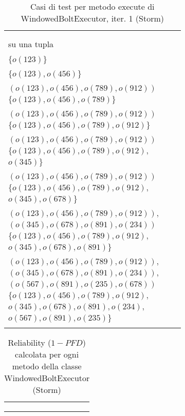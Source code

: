 \documentclass[10pt, a4paper]{article}
\newcommand{\Intmaketable}[4]{
	\begin{longtable}{#3}
	#4
	\caption{#2}
	\label{#1}
	\end{longtable}
}
\newcommand{\Inttestctable}[3]{
	\Intmaketable{#1}{#2}{|l|l|l|}{
	\hline
	\thead{Input} & \thead{Esito atteso} & \thead{Motivazione}\\
	\hline
	\hline
	#3
	\hline}
}
\newcommand{\Intreltable}[3]{
	\Intmaketable{#1}{#2}{|l|l|l|l|l|l|l|}{
	\hline
	\thead{Metodo} & \thead{\# test totali} & \thead{\# test pass.} & \thead{\# test fail.} & \thead{Prof. op.} &
	\thead{Distribuzione} & \thead{Reliability}\\
	\hline
	\hline
	#3
	\hline}
}
\newcommand{\Inttestccaption}[4]{Casi di test per metodo #1 di #2, iter. #3 (#4)}
\newcommand{\Intrelcaption}[2]{Reliability ($1-PFD$) calcolata per ogni metodo della classe #1 (#2)}
\newcommand{\gettablelabel}[5]{table:#1:#2:#3:iter#4:proj#5}
\newcommand{\getreltablelabel}[2]{\gettablelabel{#1}{}{}{}{#2}}
\newcommand{\testctable}[5]{
	\Inttestctable{\gettablelabel{testc}{#1}{#2}{#3}{#4}}
		{\Inttestccaption{#1}{#2}{#3}{#4}}
		{#5}
}
\newcommand{\reltable}[3] {
	\Intreltable{\getreltablelabel{#1}{#2}}
		{\Intrelcaption{#1}{#2}}
		{#3}
}
\newcommand{\unifdist}[1]{Uniforme: $#1$}
\newcommand{\tcell}{\makecell[tl]}
\newcommand{\newtrow}{\\ \hline}
\def\storm{Storm}
\begin{document}
	\testctable{execute}{WindowedBoltExecutor}{1}{\storm}{
			\tcell{null} &
			\tcell{RuntimeException viene lanciata} &
			\tcell{} 
		\newtrow
			\tcell{makeTuple(123)} &
			\tcell{Nessuna tupla di finestre} &
			\tcell{Nessun pre-esecuzione del bolt\\ su una tupla} 
		\newtrow
			\tcell{makeTuple(456)} &
			\tcell{Nessuna tupla di finestre} &
			\tcell{Pre-esecuzione del bolt su tupla\\$\{o(123)\}$} 
		\newtrow
			\tcell{makeTuple(789)} &
			\tcell{Nessuna tupla di finestre} &
			\tcell{Pre-esecuzione del bolt su tuple\\$\{o(123),o(456)\}$} 
		\newtrow
			\tcell{makeTuple(912)} &
			\tcell{Una finestra di tuple:\\$(o(123),o(456),o(789),o(912))$} &
			\tcell{Pre-esecuzione del bolt su tuple\\$\{o(123),o(456),o(789)\}$} 
		\newtrow
			\tcell{makeTuple(345)} &
			\tcell{Una finestra di tuple:\\$(o(123),o(456),o(789),o(912))$} &
			\tcell{Pre-esecuzione del bolt su tuple\\$\{o(123),o(456),o(789),o(912)\}$} 
		\newtrow
			\tcell{makeTuple(678)} &
			\tcell{Una finestra di tuple:\\$(o(123),o(456),o(789),o(912))$} &
			\tcell{Pre-esecuzione del bolt su tuple\\$\{o(123),o(456),o(789),o(912),$\\$o(345)\}$} 
		\newtrow
			\tcell{makeTuple(891)} &
			\tcell{Una finestra di tuple:\\$(o(123),o(456),o(789),o(912))$} &
			\tcell{Pre-esecuzione del bolt su tuple\\$\{o(123),o(456),o(789),o(912),$\\$o(345),o(678)\}$} 
		\newtrow
			\tcell{makeTuple(234)} &
			\tcell{Due finestre di tuple:
				\\$(o(123),o(456),o(789),o(912)),$\\$(o(345),o(678),o(891),o(234))$} &
			\tcell{Pre-esecuzione del bolt su tuple\\$\{o(123),o(456),o(789),o(912),$\\$o(345),o(678),o(891)\}$} 
		\newtrow
			\tcell{makeTuple(678)} &
			\tcell{Tre finestre di tuple:
				\\$(o(123),o(456),o(789),o(912)),$\\$(o(345),o(678),o(891),o(234)),$\\
				$(o(567),o(891),o(235),o(678))$} &
			\tcell{Pre-esecuzione del bolt su tuple\\$\{o(123),o(456),o(789),o(912),$\\$o(345),o(678),o(891),o(234),$\\
				$o(567),o(891),o(235)\}$} 
		\newtrow
	}
	
	\reltable{WindowedBoltExecutor}{\storm} {
			\tcell{prepare} &
			\tcell{$18$} &
			\tcell{$17$} &
			\tcell{$1$} &
			\tcell{
				tabella $\ref{\gettablelabel{testc}{prepare}{WindowedBoltExecutor}{1}{\storm}}$} &
			\tcell{\unifdist{0.055}} &
			\tcell{$0.945$}
		\newtrow
			\tcell{execute} &
			\tcell{$?$} &
			\tcell{$?$} &
			\tcell{$?$} &
			\tcell{
				tabella $?$} &
			\tcell{\unifdist{?}} &
			\tcell{$?$}
		\newtrow
	}
	
	
\end{document}
